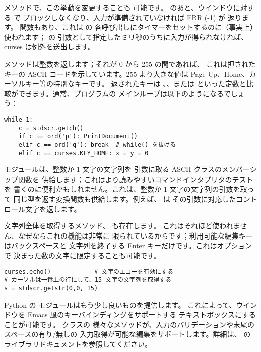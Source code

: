 \documentclass{howto}
\begin{document}
 メソッドで、この挙動を変更することも
可能です。 のあと、ウインドウに対する  で
ブロックしなくなり、入力が準備されていなければ ERR (-1) が
返ります。 関数もあり、これは  の
各呼び出しにタイマーをセットするのに（事実上）使われます； の
引数として指定したミリ秒のうちに入力が得られなければ、curses は例外を送出します。

 メソッドは整数を返します；それが 0 から 255 の間であれば、
これは押されたキーの ASCII コードを示しています。255 より大きな値は
Page Up、Home、カーソルキー等の特別なキーです。
返されたキーは 、、または
 といった定数と比較ができます。通常、プログラムの
メインループは以下のようになるでしょう：

\begin{verbatim}
while 1:
    c = stdscr.getch()
    if c == ord('p'): PrintDocument()
    elif c == ord('q'): break  # while() を抜ける
    elif c == curses.KEY_HOME: x = y = 0
\end{verbatim}

 モジュールは、整数か 1 文字の文字列を
引数に取る ASCII クラスのメンバーシップ関数を
供給します；これはより読みやすいコマンドインタプリタのテストを
書くのに便利かもしれません。これは、整数か 1 文字の文字列の引数を取って
同じ型を返す変換関数も供給します。例えば、 は
その引数に対応したコントロール文字を返します。

文字列全体を取得するメソッド、 も存在します。
これはそれほど使われません、なぜならこれの機能は非常に
限られているからです；利用可能な編集キーはバックスペースと
文字列を終了する Enter キーだけです。これはオプションで
決まった数の文字に限定することも可能です。

\begin{verbatim}
curses.echo()            # 文字のエコーを有効にする
# カーソルは一番上の行にして、15 文字の文字列を取得する
s = stdscr.getstr(0,0, 15)  
\end{verbatim}

Python の  モジュールはもう少し良いものを提供します。
これによって、ウインドウを Emacs 風のキーバインディングをサポートする
テキストボックスにすることが可能です。 クラスの
様々なメソッドが、入力のバリデーションや末尾のスペースの有り/無しの
入力取得が可能な編集をサポートします。詳細は、 の
ライブラリドキュメントを参照してください。
\end{document}
